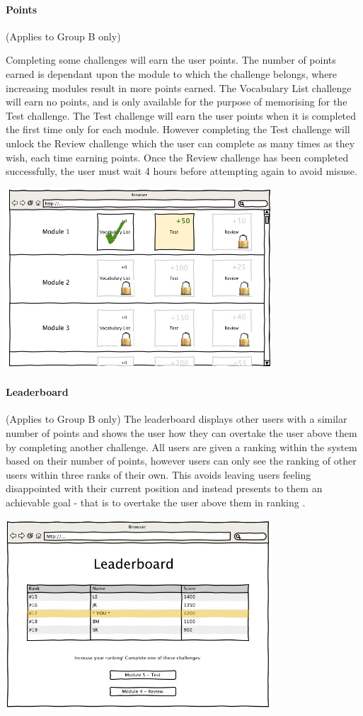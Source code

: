 \paragraph{Points}
(Applies to Group B only)

Completing some challenges will earn the user points. The number of points earned is
dependant upon the module to which the challenge belongs, where increasing modules
result in more points earned. The Vocabulary List challenge will earn no points,
and is only available for the purpose of memorising for the Test challenge. The
Test challenge will earn the user points when it is completed the first time only
for each module. However completing the Test challenge will unlock the Review
challenge which the user can complete as many times as they wish, each time earning
points. Once the Review challenge has been completed successfully, the user must
wait 4 hours before attempting again to avoid misuse.

\includegraphics[width=10cm]{./screens/modules.jpg}\\

\paragraph{Leaderboard}
(Applies to Group B only)
The leaderboard displays other users with a similar number of points and shows
the user how they can overtake the user above them by completing another
challenge. All users are given a ranking within the system based on their
number of points, however users can only see the ranking of other users within
three ranks of their own. This avoids leaving users feeling disappointed with
their current position and instead presents to them an achievable goal - that is to
overtake the user above them in ranking \cite{gabe_zichermann_fun_2010}.

\includegraphics[width=10cm]{./screens/leaderboard.jpg}\\
